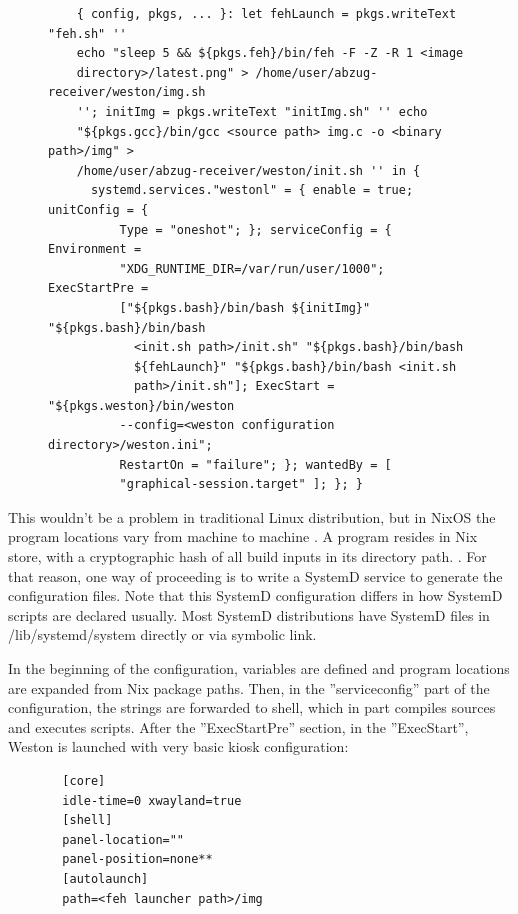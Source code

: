 \begin{figure}[H]
\begin{lstlisting} 
    { config, pkgs, ... }: let fehLaunch = pkgs.writeText "feh.sh" ''
    echo "sleep 5 && ${pkgs.feh}/bin/feh -F -Z -R 1 <image
    directory>/latest.png" > /home/user/abzug-receiver/weston/img.sh
    ''; initImg = pkgs.writeText "initImg.sh" '' echo
    "${pkgs.gcc}/bin/gcc <source path> img.c -o <binary path>/img" >
    /home/user/abzug-receiver/weston/init.sh '' in {
      systemd.services."westonl" = { enable = true; unitConfig = {
          Type = "oneshot"; }; serviceConfig = { Environment =
          "XDG_RUNTIME_DIR=/var/run/user/1000"; ExecStartPre =
          ["${pkgs.bash}/bin/bash ${initImg}" "${pkgs.bash}/bin/bash
            <init.sh path>/init.sh" "${pkgs.bash}/bin/bash
            ${fehLaunch}" "${pkgs.bash}/bin/bash <init.sh
            path>/init.sh"]; ExecStart = "${pkgs.weston}/bin/weston
          --config=<weston configuration directory>/weston.ini";
          RestartOn = "failure"; }; wantedBy = [
          "graphical-session.target" ]; }; }
\end{lstlisting}
\label{systemd1}
\end{figure}

This wouldn't be a problem in traditional Linux distribution, but in
NixOS the program locations vary from machine to machine
\cite{dolstra2010nixos}. A program resides in Nix store, with a
cryptographic hash of all build inputs in its directory
path. \cite{dolstra2010nixos}. For that reason, one way of proceeding
is to write a SystemD service to generate the configuration
files. Note that this SystemD configuration differs in how SystemD
scripts are declared usually. Most SystemD distributions have SystemD
files in /lib/systemd/system directly or via symbolic link.

In the beginning of the configuration, variables are defined and
program locations are expanded from Nix package paths. Then, in the
''serviceconfig'' part of the configuration, the strings are forwarded
to shell, which in part compiles sources and executes scripts. After
the ''ExecStartPre'' section, in the ''ExecStart'', Weston is launched
with very basic kiosk configuration:

\begin{figure}
\begin{lstlisting} 
  [core]
  idle-time=0 xwayland=true
  [shell]
  panel-location=""
  panel-position=none**
  [autolaunch]
  path=<feh launcher path>/img
\end{lstlisting}
\label{westonconf}
\end{figure}

